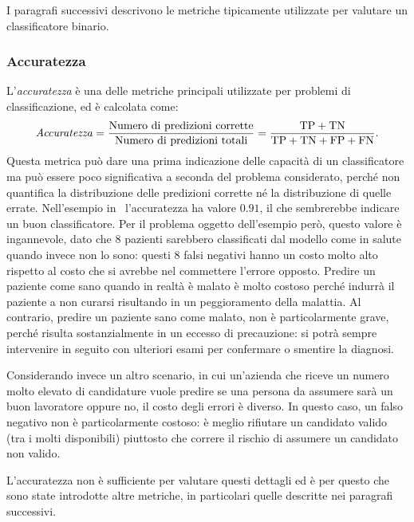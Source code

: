 
I paragrafi successivi descrivono le metriche tipicamente utilizzate per valutare un classificatore binario.

\subsubsection{Accuratezza} L'\emph{accuratezza} è una delle metriche principali utilizzate per problemi di classificazione, ed è calcolata come:
\begin{equation*}
    \textrm{\emph{Accuratezza}} = \frac{\text{Numero di predizioni corrette}}{\text{Numero di predizioni totali}} = \frac{\text{TP} + \text{TN}}{\text{TP} + \text{TN} + \text{FP} + \text{FN}}.
\end{equation*}
Questa metrica può dare una prima indicazione delle capacità di un classificatore ma può essere poco significativa a seconda del problema considerato, perché non quantifica la distribuzione delle predizioni corrette né la distribuzione di quelle errate.
Nell'esempio in~ l'accuratezza ha valore $0.91$, il che sembrerebbe indicare un buon classificatore.
Per il problema oggetto dell'esempio però, questo valore è ingannevole, dato che 8 pazienti sarebbero classificati dal modello come in salute quando invece non lo sono: questi 8 falsi negativi hanno un costo molto alto rispetto al costo che si avrebbe nel commettere l'errore opposto. 
Predire un paziente come sano quando in realtà è malato è molto costoso perché indurrà il paziente a non curarsi risultando in un peggioramento della malattia. 
Al contrario, predire un paziente sano come malato, non è particolarmente grave, perché risulta sostanzialmente in un eccesso di precauzione: si potrà sempre intervenire in seguito con ulteriori esami per confermare o smentire la diagnosi.

Considerando invece un altro scenario, in cui un'azienda che riceve un numero molto elevato di candidature vuole predire se una persona da assumere sarà un buon lavoratore oppure no, il costo degli errori è diverso. In questo caso, un falso negativo non è particolarmente costoso: è meglio rifiutare un candidato valido (tra i molti disponibili) piuttosto che correre il rischio di assumere un candidato non valido. 

L'accuratezza non è sufficiente per valutare questi dettagli ed è per questo che sono state introdotte altre metriche, in particolari quelle descritte nei paragrafi successivi.

